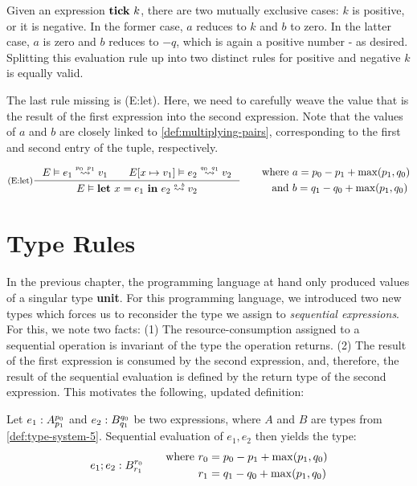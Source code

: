 Given an expression \(\mathbf{tick}~k\), there are two mutually exclusive cases: \(k\) is positive, or it is negative. In the former case, \(a\) reduces to \(k\) and \(b\) to zero. In the latter case, \(a\) is zero and \(b\) reduces to \(-q\), which is again a positive number - as desired. Splitting this evaluation rule up into two distinct rules for positive and negative \(k\) is equally valid.

The last rule missing is (E:let). Here, we need to carefully weave the value that is the result of the first expression into the second expression. Note that the values of \(a\) and \(b\) are closely linked to \cref{def:multiplying-pairs}, corresponding to the first and second entry of the tuple, respectively.

\[
   \inference[(E:let)]
   {\evals{E}{e_1}{v_1}{p_0}{p_1} \qquad \evals{\envaugment{E}{x}{v_1}}{e_2}{v_2}{q_0}{q_1}}
   {\evals{E}{\letexp{x}{e_1}{e_2}}{v_2}{a}{b}}%
   \qquad
   \begin{aligned}
      \text{where }  &a = p_0 - p_1 + \max(p_1, q_0)\\
      \text{and }    &b = q_1 - q_0 + \max(p_1, q_0) 
   \end{aligned}
\]


\section{Type Rules}\label{sec:type-rules-5}

In the previous chapter, the programming language at hand only produced values of a singular type \textbf{unit}. For this programming language, we introduced two new types which forces us to reconsider the type we assign to \emph{sequential expressions}. For this, we note two facts: (1) The resource-consumption assigned to a sequential operation is invariant of the type the operation returns. (2) The result of the first expression is consumed by the second expression, and, therefore, the result of the sequential evaluation is defined by the return type of the second expression. This motivates the following, updated definition:

\begin{definition}
   Let \(e_1 : A ^{p_0}_{p_1}\) and \(e_2 : B ^{q_0}_{q_1}\) be two expressions, where \(A\) and \(B\) are types from \cref{def:type-system-5}. Sequential evaluation of \(e_1, e_2\) then yields the type:
   \[
      e_1;e_2 : B ^{r_0}_{r_1}
      \qquad
      \begin{aligned}
	 \text{where }	&r_0 = p_0 - p_1 + \max(p_1, q_0) \\
			&r_1 = q_1 - q_0 + \max(p_1, q_0)
      \end{aligned}
   \]
\end{definition}

